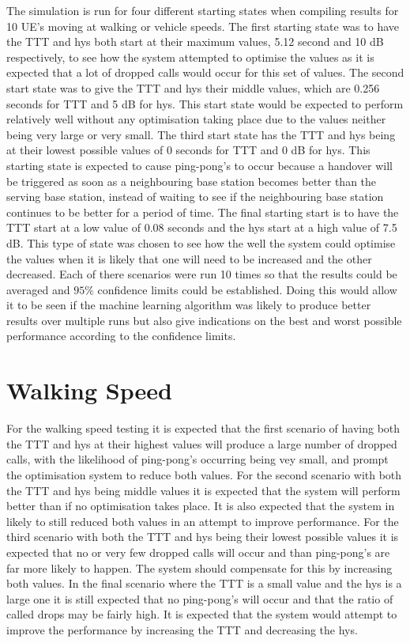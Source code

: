 The simulation is run for four different starting states when compiling results for 10 UE's moving at walking or vehicle speeds. The first starting state was to have the TTT and hys both start at their maximum values, 5.12 second and 10 dB respectively, to see how the system attempted to optimise the values as it is expected that a lot of dropped calls would occur for this set of values. The second start state was to give the TTT and hys their middle values, which are 0.256 seconds for TTT and 5 dB for hys. This start state would be expected to perform relatively well without any optimisation taking place due to the values neither being very large or very small. The third start state has the TTT and hys being at their lowest possible values of 0 seconds for TTT and 0 dB for hys. This starting state is expected to cause ping-pong's to occur because a handover will be triggered as soon as a neighbouring base station becomes better than the serving base station, instead of waiting to see if the neighbouring base station continues to be better for a period of time. The final starting start is to have the TTT start at a low value of 0.08 seconds and the hys start at a high value of 7.5 dB. This type of state was chosen to see how the well the system could optimise the values when it is likely that one will need to be increased and the other decreased. Each of there scenarios were run 10 times so that the results could be averaged and $95\%$ confidence limits could be established. Doing this would allow it to be seen if the machine learning algorithm was likely to produce better results over multiple runs but also give indications on the best and worst possible performance according to the confidence limits.
\section{Walking Speed}\label{walk}
For the walking speed testing it is expected that the first scenario of having both the TTT and hys at their highest values will produce a large number of dropped calls, with the likelihood of ping-pong's occurring being vey small, and prompt the optimisation system to reduce both values. For the second scenario with both the TTT and hys being middle values it is expected that the system will perform better than if no optimisation takes place. It is also expected that the system in likely to still reduced both values in an attempt to improve performance. For the third scenario with both the TTT and hys being their lowest possible values it is expected that no or very few dropped calls will occur and than ping-pong's are far more likely to happen. The system should compensate for this by increasing both values. In the final scenario where the TTT is a small value and the hys is a large one it is still expected that no ping-pong's will occur and that the ratio of called drops may be fairly high. It is expected that the system would attempt to improve the performance by increasing the TTT and decreasing the hys.
